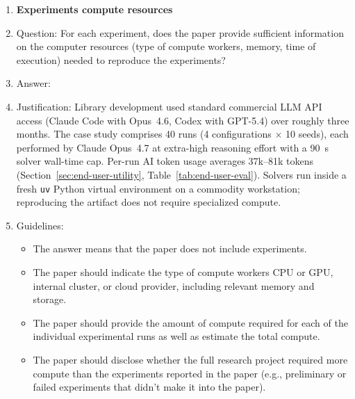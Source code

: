 \begin{enumerate}
\item {\bf Experiments compute resources}
    \item[] Question: For each experiment, does the paper provide sufficient information on the computer resources (type of compute workers, memory, time of execution) needed to reproduce the experiments?
    \item[] Answer: \answerYes{}
    \item[] Justification: Library development used standard commercial LLM API access (Claude Code with Opus~4.6, Codex with GPT-5.4) over roughly three months. The case study comprises 40 runs (4 configurations $\times$ 10 seeds), each performed by Claude Opus~4.7 at extra-high reasoning effort with a 90~s solver wall-time cap. Per-run AI token usage averages 37k--81k tokens (Section~\ref{sec:end-user-utility}, Table~\ref{tab:end-user-eval}). Solvers run inside a fresh \texttt{uv} Python virtual environment on a commodity workstation; reproducing the artifact does not require specialized compute.
    \item[] Guidelines:
    \begin{itemize}
        \item The answer \answerNA{} means that the paper does not include experiments.
        \item The paper should indicate the type of compute workers CPU or GPU, internal cluster, or cloud provider, including relevant memory and storage.
        \item The paper should provide the amount of compute required for each of the individual experimental runs as well as estimate the total compute.
        \item The paper should disclose whether the full research project required more compute than the experiments reported in the paper (e.g., preliminary or failed experiments that didn't make it into the paper).
    \end{itemize}


\end{enumerate}
